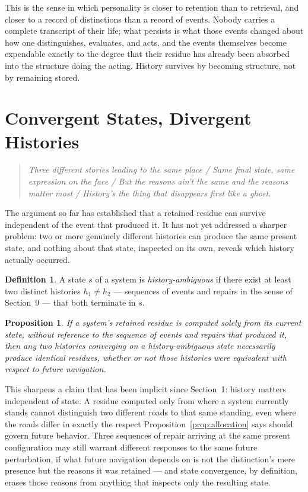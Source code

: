 \documentclass[11pt]{amsart}
\theoremstyle{plain}
\newtheorem{proposition}[theorem]{Proposition}
\theoremstyle{definition}
\newtheorem{definition}[theorem]{Definition}
\theoremstyle{remark}
\begin{document}
This is the sense in which personality is closer to retention than to
retrieval, and closer to a record of distinctions than a record of
events. Nobody carries a complete transcript of their life; what
persists is what those events changed about how one distinguishes,
evaluates, and acts, and the events themselves become expendable
exactly to the degree that their residue has already been absorbed into
the structure doing the acting. History survives by becoming structure,
not by remaining stored.

\section{Convergent States, Divergent Histories}

\begin{quotation}
\emph{Three different stories leading to the same place / Same final
state, same expression on the face / But the reasons ain't the same and
the reasons matter most / History's the thing that disappears first
like a ghost.}
\end{quotation}

The argument so far has established that a retained residue can survive
independent of the event that produced it. It has not yet addressed a
sharper problem: two or more genuinely different histories can produce
the same present state, and nothing about that state, inspected on its
own, reveals which history actually occurred.

\begin{definition}
A state $s$ of a system is \emph{history-ambiguous} if there exist at
least two distinct histories $h_1 \neq h_2$ --- sequences of events and
repairs in the sense of Section~9 --- that both terminate in $s$.
\end{definition}

\begin{proposition}
\label{prop:history-ambiguity}
If a system's retained residue is computed solely from its current
state, without reference to the sequence of events and repairs that
produced it, then any two histories converging on a history-ambiguous
state necessarily produce identical residues, whether or not those
histories were equivalent with respect to future navigation.
\end{proposition}

This sharpens a claim that has been implicit since Section~1: history
matters independent of state. A residue computed only from where a
system currently stands cannot distinguish two different roads to that
same standing, even where the roads differ in exactly the respect
Proposition~\ref{prop:allocation} says should govern future behavior.
Three sequences of repair arriving at the same present configuration
may still warrant different responses to the same future perturbation,
if what future navigation depends on is not the distinction's mere
presence but the reasons it was retained --- and state convergence, by
definition, erases those reasons from anything that inspects only the
resulting state.
\end{document}
